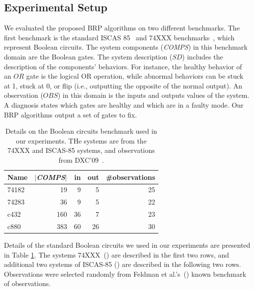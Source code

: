 \documentclass[review]{elsarticle}
\newcommand\meir[1]{\textcolor{red}{meir: #1}}
\newcommand{\COMPS}{\textit{COMPS}}
\newcommand{\SD}{\textit{SD}}
\newcommand{\OBS}{\textit{OBS}}
\newcommand{\shortcite}{\cite}
\begin{document}
\subsection{Experimental Setup}

 We evaluated the proposed BRP algorithms on two different benchmarks. The first benchmark is the standard ISCAS 85~\cite{Brglez89} and 74XXX benchmarks~\cite{Hansen99}, which represent Boolean circuits. %
The system components (\COMPS) in this benchmark domain are the Boolean gates. The system description ($\SD$) includes the description of the components' behaviors. For instance, the healthy behavior of an $\textit{OR}$ gate is the logical OR operation, while abnormal behaviors can be stuck at 1, stuck at 0, or flip (i.e., outputting the opposite of the normal output). An observation ($\OBS$) in this domain is the inputs and outputs values of the system. A diagnosis states which gates are healthy and which are in a faulty mode. Our BRP algorithms output a set of gates to fix. 

\begin{table}\centering
{\small
\begin{tabular}{|l|r|r|r|r|}
\hline
 {\bf Name} & {\bf $|${\tiny \COMPS}$|$} & {\bf in} & {\bf out} & {\bf \#observations} \\
\hline
    74182  & 19    & 9    & 5    & 25 \\
    74283  & 36    & 9    & 5    & 22 \\
\hline
    c432   & 160   & 36   & 7    & 23\\
    c880   & 383   & 60   & 26   &  30\\
\hline
\end{tabular}
\caption{Details on the Boolean circuits benchmark used in our experiments. THe systems are from the {\small 74XXX} and {\small ISCAS-85} systems, and observations from DXC'09~\cite{feldman2010approximate}.}
\label{tab:systems}
}
\end{table}%


Details of the standard Boolean circuits we used in our experiments are presented in Table \ref{tab:systems}. The systems {\small 74XXX}~(\cite{Hansen99}) are described in the first two rows, and additional two systems of {\small ISCAS-85} (\cite{Brglez89}) are described in the following two rows. Observations were selected randomly from Feldman et al.'s~(\shortcite{feldman2010approximate}) known benchmark of observations.
\end{document}
